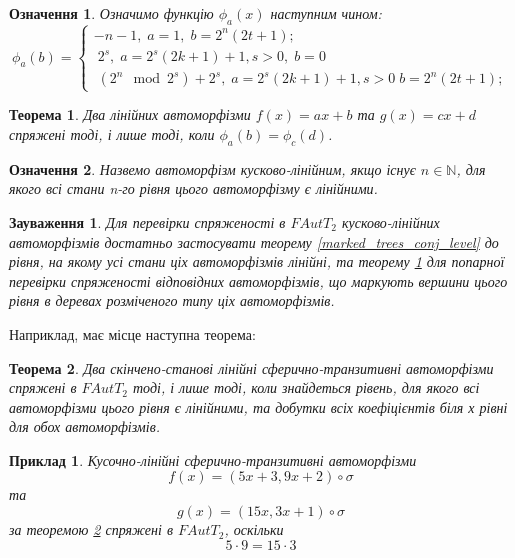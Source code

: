\documentclass[a4paper,12pt]{article} \usepackage{a4wide}
\numberwithin{equation}{subsection}
\newtheorem{theorem}{Теорема}[subsection]
\newtheorem{remark}{Зауваження}[subsection]
\newtheorem{definition}{Означення}[subsection]
\newtheorem{example}{Приклад}[subsection]
\begin{document}
\begin{definition}
  Означимо функцію $\phi_a(x)$ наступним чином:
  \begin{equation*}
    \phi_a(b) =
    \begin{cases}
      -n-1, \; a = 1,\; b = 2^n(2t+1) ; \\
      \; 2^s,\;  a = 2^s(2k+1)+1, s>0, \; b = 0 \\
      \; (2^n \mod 2^s)+2^s,\; a = 2^s(2k+1)+1, s>0\; b = 2^n(2t+1) ;
    \end{cases}
  \end{equation*}
\end{definition}

          \begin{theorem}\label{final_lin_conj}
            Два лінійних автоморфізми $f(x) = ax+b$ та $g(x) = cx+d$
            спряжені тоді, і лише тоді, коли $\phi_a(b) = \phi_c(d)$.
          \end{theorem}

\begin{definition}\label{part_lin_def1}
  Назвемо автоморфізм кусково-лінійним, якщо існує $n\in \mathbb{N}$,
  для якого всі стани n-го рівня цього автоморфізму є лінійними.
\end{definition}

\begin{remark}\label{All_lin_tree}
  Для перевірки спряженості в $FAutT_2$ кусково-лінійних автоморфізмів
  достатньо застосувати теорему \ref{marked_trees_conj_level} до
  рівня, на якому усі стани ціх автоморфізмів лінійні, та теорему
  \ref{final_lin_conj} для попарної перевірки спряженості відповідних
  автоморфізмів, що маркують вершини цього рівня в деревах розміченого
  типу ціх автоморфізмів.
\end{remark}
Наприклад, має місце наступна теорема:
\begin{theorem}\label{sph_tr_part_lin_conj}
  Два скінчено-станові лінійні сферично-транзитивні автоморфізми
  спряжені в $FAutT_2$ тоді, і лише тоді, коли знайдеться рівень, для
  якого всі автоморфізми цього рівня є лінійними, та добутки всіх
  коефіцієнтів біля х рівні для обох автоморфізмів.
\end{theorem}

\begin{example}
  Кусочно-лінійні сферично-транзитивні автоморфізми $$f(x)= (5x +3 ,
  9x + 2 )\circ \sigma $$ та $$g(x)= (15x , 3x+1 )\circ \sigma $$ за
  теоремою \ref{sph_tr_part_lin_conj} спряжені в $FAutT_2$, оскільки
$$5\cdot 9 = 15\cdot 3$$
\end{example}
\end{document}
